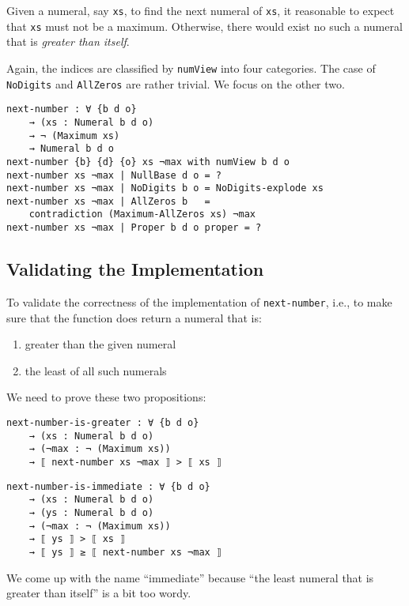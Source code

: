 \documentclass[\main/thesis.tex]{subfiles}
\begin{document}
Given a numeral, say {\lstinline|xs|}, to find the next numeral of {\lstinline|xs|},
it reasonable to expect that {\lstinline|xs|} must not be a maximum.
Otherwise, there would exist no such a numeral that is \textit{greater than itself}.

Again, the indices are classified by {\lstinline|numView|} into four categories.
The case of {\lstinline|NoDigits|} and {\lstinline|AllZeros|} are rather trivial.
We focus on the other two.

\begin{lstlisting}
next-number : ∀ {b d o}
    → (xs : Numeral b d o)
    → ¬ (Maximum xs)
    → Numeral b d o
next-number {b} {d} {o} xs ¬max with numView b d o
next-number xs ¬max | NullBase d o = ?
next-number xs ¬max | NoDigits b o = NoDigits-explode xs
next-number xs ¬max | AllZeros b   =
    contradiction (Maximum-AllZeros xs) ¬max
next-number xs ¬max | Proper b d o proper = ?
\end{lstlisting}

\subsection{Validating the Implementation}

To validate the correctness of the implementation of {\lstinline|next-number|},
i.e., to make sure that the function does return a numeral that is:

\begin{enumerate}
    \item greater than the given numeral
    \item the least of all such numerals
\end{enumerate}

We need to prove these two propositions:

\begin{lstlisting}
next-number-is-greater : ∀ {b d o}
    → (xs : Numeral b d o)
    → (¬max : ¬ (Maximum xs))
    → ⟦ next-number xs ¬max ⟧ > ⟦ xs ⟧
\end{lstlisting}

\begin{lstlisting}
next-number-is-immediate : ∀ {b d o}
    → (xs : Numeral b d o)
    → (ys : Numeral b d o)
    → (¬max : ¬ (Maximum xs))
    → ⟦ ys ⟧ > ⟦ xs ⟧
    → ⟦ ys ⟧ ≥ ⟦ next-number xs ¬max ⟧
\end{lstlisting}

We come up with the name ``immediate''
because ``the least numeral that is greater than itself'' is a bit too wordy.
\end{document}
